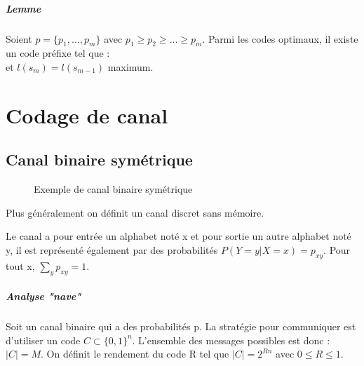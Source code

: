 \documentclass[12pt,a4paper]{report}
\begin{document}
\paragraph{Lemme\\}
Soient $p=\{p_1,\ldots,p_m\} $ avec $ p_1 \geqslant p_2 \geqslant \ldots \geqslant p_m$. Parmi les codes optimaux, il existe un code préfixe tel que :\\
  \scalebox{0.4}{}
  et $l(s_m)=l(s_{m-1})$ maximum.
  
\chapter{Codage de canal}
\begin{figure}[h]
	\centering
  \scalebox{0.8}{}	
\end{figure}
\section{Canal binaire symétrique}
\begin{figure}[h]
	\centering
  \scalebox{0.8}{}	
	\caption{Exemple de canal binaire symétrique}
\end{figure}

Plus généralement on définit un canal discret sans mémoire.\\
\begin{figure}[h]
	\centering
  \scalebox{0.5}{}	
\end{figure}
Le canal a pour entrée un alphabet noté x et pour sortie un autre alphabet noté y, il est représenté également par des probabilités $P(Y=y|X=x) = p_{xy}$. Pour tout x, $\displaystyle \sum_{y} p_{xy} = 1$.
\paragraph{Analyse "nave"\\}
Soit un canal binaire qui a des probabilités p. La stratégie pour communiquer est d'utiliser un code $ C \subset \{0,1\}^n$. L'ensemble des messages possibles est donc : $|C| = M$.
On définit le rendement du code R tel que $|C|=2^{Rn}$ avec $ 0 \leqslant R \leqslant 1$.
\end{document}
